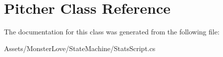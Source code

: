 \hypertarget{class_pitcher}{}\section{Pitcher Class Reference}
\label{class_pitcher}


The documentation for this class was generated from the following file\+:\begin{DoxyCompactItemize}
\item 
Assets/\+Monster\+Love/\+State\+Machine/Stats\+Script.\+cs\end{DoxyCompactItemize}
